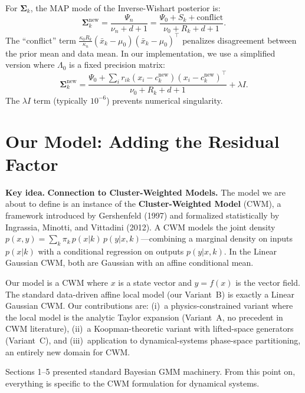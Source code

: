\documentclass[11pt]{article}
\theoremstyle{definition}
\theoremstyle{plain}
\theoremstyle{remark}
\newcommand{\Sv}{\boldsymbol{\Sigma}}
\newenvironment{keyidea}{\par\medskip\noindent\textbf{Key idea.} }{\par\medskip}
\begin{document}
For $\Sv_k$, the MAP mode of the Inverse-Wishart posterior is:
\begin{equation}
  \Sv_k^{\mathrm{new}} = \frac{\Psi_n}{\nu_n+d+1} = \frac{\Psi_0+S_k+\text{conflict}}{\nu_0+R_k+d+1}.
\end{equation}
The ``conflict'' term $\frac{\kappa_0 R_k}{\kappa_n}(\bar{x}_k-\mu_0)(\bar{x}_k-\mu_0)^\top$ penalizes disagreement between the prior mean and data mean. In our implementation, we use a simplified version where $\Lambda_0$ is a fixed precision matrix:
\begin{equation}
  \Sv_k^{\mathrm{new}} = \frac{\Psi_0+\sum_i r_{ik}(x_i-c_k^{\mathrm{new}})(x_i-c_k^{\mathrm{new}})^\top}{\nu_0+R_k+d+1} + \lambda I.
\end{equation}
The $\lambda I$ term (typically $10^{-6}$) prevents numerical singularity.

\section{Our Model: Adding the Residual Factor}\label{sec:our-model}

\begin{keyidea}
\textbf{Connection to Cluster-Weighted Models.} The model we are about to define is an instance of the \textbf{Cluster-Weighted Model} (CWM), a framework introduced by Gershenfeld (1997) and formalized statistically by Ingrassia, Minotti, and Vittadini (2012). A CWM models the joint density $p(x,y)=\sum_k\pi_k\,p(x|k)\,p(y|x,k)$---combining a marginal density on inputs $p(x|k)$ with a conditional regression on outputs $p(y|x,k)$. In the Linear Gaussian CWM, both are Gaussian with an affine conditional mean.

Our model is a CWM where $x$ is a state vector and $y=f(x)$ is the vector field. The standard data-driven affine local model (our Variant~B) is exactly a Linear Gaussian CWM. Our contributions are: (i)~a physics-constrained variant where the local model is the analytic Taylor expansion (Variant~A, no precedent in CWM literature), (ii)~a Koopman-theoretic variant with lifted-space generators (Variant~C), and (iii)~application to dynamical-systems phase-space partitioning, an entirely new domain for CWM.

Sections 1--5 presented standard Bayesian GMM machinery. From this point on, everything is specific to the CWM formulation for dynamical systems.
\end{keyidea}
\end{document}
